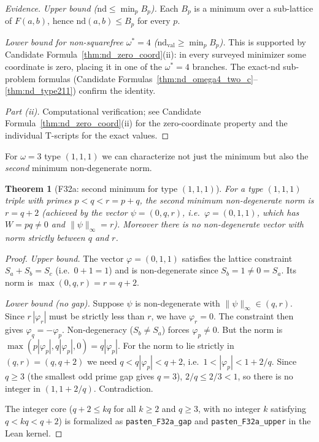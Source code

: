 \documentclass[12pt]{article}
\newtheorem{theorem}{Theorem}
\theoremstyle{definition}
\begin{document}
\begin{proof}[Evidence]
  \textit{Upper bound ($\mathrm{nd} \le \min_p B_p$).}  Each $B_p$ is a minimum over a
  sub-lattice of $F(a,b)$, hence $\mathrm{nd}(a,b) \le B_p$ for every $p$.

  \textit{Lower bound for non-squarefree $\omega^*=4$
  ($\mathrm{nd}_{\mathrm{val}} \ge \min_p B_p$).}
  This is supported by Candidate Formula~\ref{thm:nd_zero_coord}(ii): in every
  surveyed minimizer some coordinate is zero, placing it in one of the
  $\omega^*=4$ branches.
  The exact-nd sub-problem formulas (Candidate Formulas~\ref{thm:nd_omega4_two_c}--\ref{thm:nd_type211})
  confirm the identity.

  \textit{Part (ii).}  Computational verification; see Candidate Formula~\ref{thm:nd_zero_coord}(ii)
  for the zero-coordinate property and the individual T-scripts for the exact values.
\end{proof}

For $\omega=3$ type $(1,1,1)$ we can characterize not just the minimum but also the
\emph{second} minimum non-degenerate norm.

\begin{theorem}[F32a: second minimum for type $(1,1,1)$]\label{thm:f32a}
  For a type $(1,1,1)$ triple with primes $p < q < r = p+q$,
  the second minimum non-degenerate norm is $r = q+2$ (achieved by
  the vector $\psi=(0,q,r)$, i.e.\ $\varphi=(0,1,1)$, which has
  $W=pq\ne 0$ and $\|\psi\|_\infty = r$).
  Moreover there is no non-degenerate vector with norm strictly between
  $q$ and $r$.
\end{theorem}

\begin{proof}
  \textit{Upper bound.}  The vector $\varphi=(0,1,1)$ satisfies the lattice
  constraint $S_a + S_b = S_c$ (i.e.\ $0 + 1 = 1$) and is non-degenerate since
  $S_b = 1 \ne 0 = S_a$.  Its norm is $\max(0, q, r) = r = q+2$.

  \textit{Lower bound (no gap).}  Suppose $\psi$ is non-degenerate with
  $\|\psi\|_\infty \in (q, r)$.  Since $r\,|\varphi_r|$ must be strictly less than
  $r$, we have $\varphi_r = 0$.  The constraint then gives $\varphi_q = -\varphi_p$.
  Non-degeneracy ($S_b \ne S_a$) forces $\varphi_p \ne 0$.  But the norm is
  $\max(p|\varphi_p|, q|\varphi_p|, 0) = q|\varphi_p|$.
  For the norm to lie strictly in $(q, r) = (q, q+2)$ we need
  $q < q|\varphi_p| < q+2$, i.e.\ $1 < |\varphi_p| < 1 + 2/q$.
  Since $q \ge 3$ (the smallest odd prime gap gives $q=3$), $2/q \le 2/3 < 1$,
  so there is no integer in $(1, 1+2/q)$.  Contradiction.

  The integer core ($q + 2 \le k q$ for all $k \ge 2$ and $q \ge 3$, with no
  integer $k$ satisfying $q < kq < q+2$) is formalized as
  \texttt{pasten\_F32a\_gap} and \texttt{pasten\_F32a\_upper} in the Lean kernel.
\end{proof}
\end{document}
